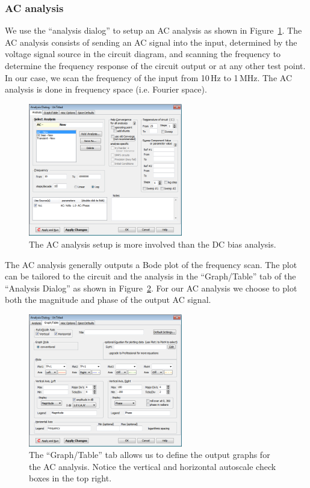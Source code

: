 \documentclass{article}
\begin{document}
\subsubsection{AC analysis}
We use the ``analysis dialog'' to setup an AC analysis as shown in Figure~\ref{fig:5spice:AC_analysis}. The AC analysis consists of sending an AC signal into the input, determined by the voltage signal source in the circuit diagram, and scanning the frequency to determine the frequency response of the circuit output or at any other test point. In our case, we scan the frequency of the input from 10\,Hz to 1\,MHz. The AC analysis is done in frequency space (i.e. Fourier space).

\begin{figure}
\begin{center}
\includegraphics[width=0.6\textwidth]{pics/5spice_AC_analysis}
\end{center}
\caption{The AC analysis setup is more involved than the DC bias analysis.}
\label{fig:5spice:AC_analysis}
\end{figure}

The AC analysis generally outputs a Bode plot of the frequency scan. The plot can be tailored to the circuit and the analysis in the ``Graph/Table'' tab of the ``Analysis Dialog'' as shown in Figure~\ref{fig:5spice:AC_analysis_output_graphs}. For our AC analysis we choose to plot both the magnitude and phase of the output AC signal.

\begin{figure}
\begin{center}
\includegraphics[width=0.6\textwidth]{pics/5spice_AC_analysis_output_graphs}
\end{center}
\caption{The ``Graph/Table'' tab allows us to define the output graphs for the AC analysis.  Notice the vertical and horizontal autoscale check boxes in the top right.}
\label{fig:5spice:AC_analysis_output_graphs}
\end{figure}
\end{document}
